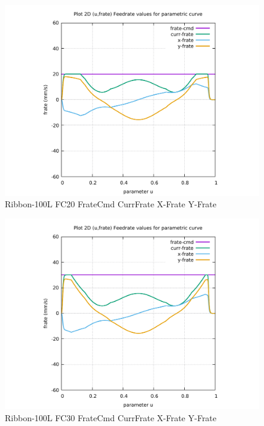 \begin{figure}
	\caption     {Ribbon-100L FC20 FrateCmd CurrFrate X-Frate Y-Frate}
	\label{28-img-Ribbon-100L-FC20-FrateCmd-CurrFrate-X-Frate-Y-Frate.pdf}
\includegraphics[width=1.00\textwidth]{Chap4/appendix/app-Ribbon-100L/plots/28-img-Ribbon-100L-FC20-FrateCmd-CurrFrate-X-Frate-Y-Frate.pdf}
\end{figure}


\clearpage
\pagebreak

\begin{figure}
	\caption     {Ribbon-100L FC30 FrateCmd CurrFrate X-Frate Y-Frate}
	\label{29-img-Ribbon-100L-FC30-FrateCmd-CurrFrate-X-Frate-Y-Frate.pdf}
\includegraphics[width=1.00\textwidth]{Chap4/appendix/app-Ribbon-100L/plots/29-img-Ribbon-100L-FC30-FrateCmd-CurrFrate-X-Frate-Y-Frate.pdf}
\end{figure}


